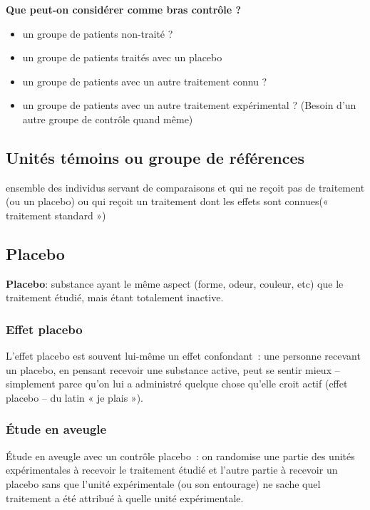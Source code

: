 \begin{center}
    \textbf{Que peut-on considérer comme bras contrôle ?}
\end{center}
\begin{itemize}
    \item un groupe de patients non-traité ?
 \item un groupe de patients traités avec un placebo
 \item un groupe de patients avec un autre traitement connu ?
 \item un groupe de patients avec un autre traitement expérimental ? (Besoin d'un autre groupe de contrôle quand même)
\end{itemize}

\subsection{Unités témoins ou groupe de références}
ensemble des individus servant de comparaisons et qui ne reçoit pas de traitement (ou un placebo) ou qui reçoit un traitement dont les effets sont connues(« traitement standard »)

\subsection{Placebo}

\textbf{Placebo}: substance ayant le même aspect (forme, odeur, couleur, etc) que le traitement étudié, mais étant totalement inactive.

\subsubsection{Effet placebo}
L’effet placebo est souvent lui-même un effet confondant : une personne recevant un placebo, en pensant recevoir une substance active, peut se sentir mieux – simplement parce qu’on lui a administré quelque chose qu’elle croit actif (effet placebo – du latin « je plais »).

\subsubsection{Étude en aveugle}
Étude en aveugle avec un contrôle placebo : on randomise une partie des unités expérimentales à recevoir le traitement étudié et l’autre partie à recevoir un placebo sans que l’unité expérimentale (ou son entourage) ne sache quel traitement a été attribué à quelle unité expérimentale.\\

